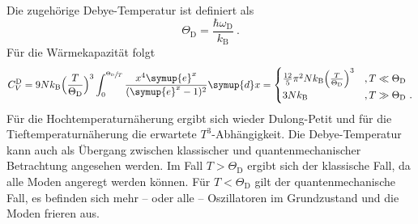     Die zugehörige Debye-Temperatur ist definiert als
    \begin{equation}
        \Theta_\text{D} = \frac{\hbar\omega_\text{D}}{k_\text{B}} \ .
        \label{eqn:theorie:Theta_D}
    \end{equation}
    Für die Wärmekapazität folgt
    \begin{equation*}
        C^\text{D}_V = 9Nk_\text{B} \Bigl(\frac{T}{\Theta_\text{D}}\Bigr) ^3
        \int_0^{\sfrac{\Theta_\text{D}}{T}} \frac{x^4 \symup{e}^x}{(\symup{e}^x - 1)^2} \symup{d}x =
        \begin{cases}
            \frac{12}{5} \pi^2 N k_\text{B} \Bigl(\frac{T}{\Theta_\text{D}}\Bigr)^3 & , T \ll \Theta_\text{D} \\
            3Nk_\text{B} & , T \gg \Theta_\text{D} \ .
        \end{cases}
    \end{equation*}
    Für die Hochtemperaturnäherung ergibt sich wieder Dulong-Petit und für die Tieftemperaturnäherung die erwartete $T^3$-Abhängigkeit.
    Die Debye-Temperatur kann auch als Übergang zwischen klassischer und quantenmechanischer Betrachtung angesehen werden.
    Im Fall $T > \Theta_\text{D}$ ergibt sich der klassische Fall,
    da alle Moden angeregt werden können.
    Für $T < \Theta_\text{D}$ gilt der quantenmechanische Fall,
    es befinden sich mehr – oder alle – Oszillatoren im Grundzustand und die Moden frieren aus.

